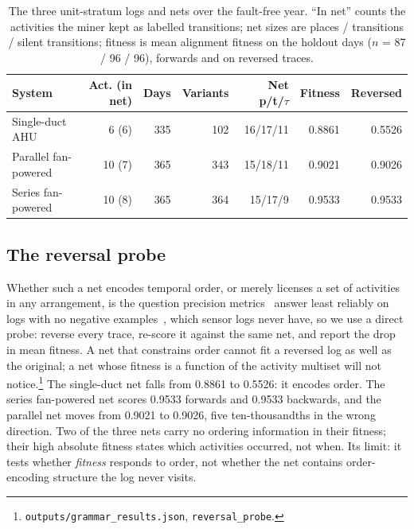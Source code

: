 \documentclass[runningheads]{llncs}
\begin{document}
\begin{table}[t]
\centering
\caption{The three unit-stratum logs and nets over the fault-free year. ``In net'' counts the activities the miner kept as labelled transitions; net sizes are places / transitions / silent transitions; fitness is mean alignment fitness on the holdout days ($n$ = 87 / 96 / 96), forwards and on reversed traces.}
\label{tab:logs}
\footnotesize\setlength{\tabcolsep}{4pt}
\begin{tabular}{lrrrrrr}
\hline
System & Act. (in net) & Days & Variants & Net p/t/$\tau$ & Fitness & Reversed \\
\hline
Single-duct AHU      & 6 (6)  & 335 & 102 & 16/17/11 & 0.8861 & 0.5526 \\
Parallel fan-powered & 10 (7) & 365 & 343 & 15/18/11 & 0.9021 & 0.9026 \\
Series fan-powered   & 10 (8) & 365 & 364 & 15/17/9  & 0.9533 & 0.9533 \\
\hline
\end{tabular}
\end{table}

\subsection{The reversal probe}

Whether such a net encodes temporal order, or merely licenses a set of activities in any arrangement, is the question precision metrics~\cite{tax2018imprecisions} answer least reliably on logs with no negative examples~\cite{vandenbroucke2014negativeevents}, which sensor logs never have, so we use a direct probe: reverse every trace, re-score it against the same net, and report the drop in mean fitness. A net that constrains order cannot fit a reversed log as well as the original; a net whose fitness is a function of the activity multiset will not notice.\footnote{\texttt{outputs/grammar\_results.json}, \texttt{reversal\_probe}.} The single-duct net falls from 0.8861 to 0.5526: it encodes order. The series fan-powered net scores 0.9533 forwards and 0.9533 backwards, and the parallel net moves from 0.9021 to 0.9026, five ten-thousandths in the wrong direction. Two of the three nets carry no ordering information in their fitness; their high absolute fitness states which activities occurred, not when. Its limit: it tests whether \emph{fitness} responds to order, not whether the net contains order-encoding structure the log never visits.
\end{document}
